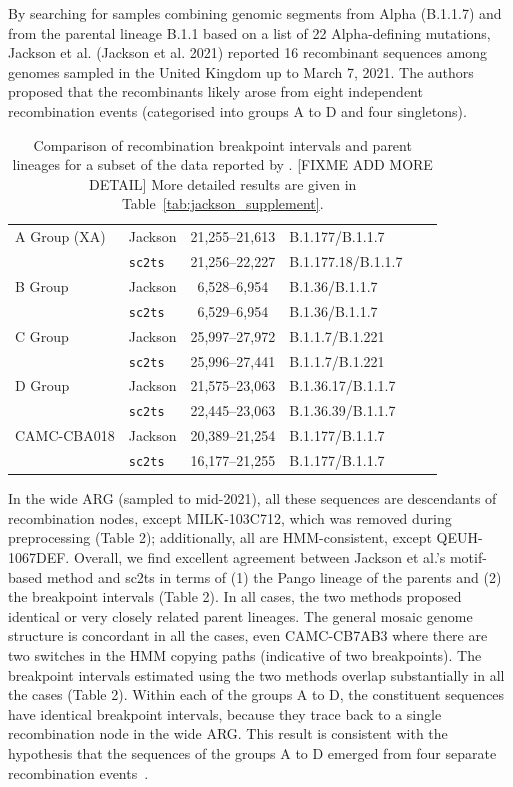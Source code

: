 \documentclass{article}
\begin{document}
By searching for samples combining genomic segments from Alpha (B.1.1.7) and
from the parental lineage B.1.1 based on a list of 22 Alpha-defining mutations,
Jackson et al. (Jackson et al. 2021) reported 16 recombinant sequences among
genomes sampled in the United Kingdom up to March 7, 2021. The authors proposed
that the recombinants likely arose from eight independent recombination events
(categorised into groups A to D and four singletons).



\begin{table} \centering
\begin{tabular}{ll|clll}
\toprule
A Group (XA) & Jackson        & 21,255–21,613 & B.1.177/B.1.1.7 \\
             & \texttt{sc2ts} &  21,256--22,227 & B.1.177.18/B.1.1.7 \\
\midrule
B Group & Jackson        &  6,528--6,954 & B.1.36/B.1.1.7  \\
        & \texttt{sc2ts} &  6,529--6,954 & B.1.36/B.1.1.7  \\
\midrule
C Group & Jackson        &  25,997--27,972 &  B.1.1.7/B.1.221 \\
        & \texttt{sc2ts} &  25,996--27,441 &  B.1.1.7/B.1.221 \\
\midrule
D Group & Jackson        &  21,575--23,063 &  B.1.36.17/B.1.1.7 \\
        & \texttt{sc2ts} &  22,445--23,063 &  B.1.36.39/B.1.1.7 \\
\midrule
CAMC-CBA018 & Jackson        &  20,389--21,254 & B.1.177/B.1.1.7 \\
            & \texttt{sc2ts} & 16,177--21,255 & B.1.177/B.1.1.7 \\
\midrule
\end{tabular}
\caption{\label{tab:jackson}Comparison of recombination breakpoint intervals
and parent lineages for a subset of the data
reported by \cite{Jackson2021-ik}. [FIXME ADD MORE DETAIL]
More detailed results are given in
Table~\ref{tab:jackson_supplement}.}
\end{table}

In the wide ARG (sampled to mid-2021), all these sequences are descendants of
recombination nodes, except MILK-103C712, which was removed during
preprocessing (Table 2); additionally, all are HMM-consistent, except
QEUH-1067DEF. Overall, we find excellent agreement between Jackson et al.’s
motif-based method and sc2ts in terms of (1) the Pango lineage of the parents
and (2) the breakpoint intervals (Table 2). In all cases, the two methods
proposed identical or very closely related parent lineages. The general mosaic
genome structure is concordant in all the cases, even CAMC-CB7AB3 where there
are two switches in the HMM copying paths (indicative of two breakpoints). The
breakpoint intervals estimated using the two methods overlap substantially in
all the cases (Table 2). Within each of the groups A to D, the constituent
sequences have identical breakpoint intervals, because they trace back to a
single recombination node in the wide ARG. This result is consistent with the
hypothesis that the sequences of the groups A to D emerged from four separate
recombination events~\cite{Jackson2021-ik}.
\end{document}
